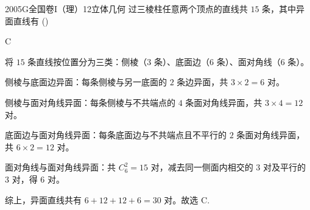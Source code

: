 
\begin{problem}{2005}{G}{全国卷I（理）}{12}{立体几何}
过三棱柱任意两个顶点的直线共 $15$ 条，其中异面直线有 (\hspace{1cm})
\begin{choices}
\end{choices}
\end{problem}

\begin{answer}
C
\end{answer}

\begin{solutions}
将 $15$ 条直线按位置分为三类：侧棱（$3$ 条）、底面边（$6$ 条）、面对角线（$6$ 条）。

侧棱与底面边异面：每条侧棱与另一底面的 $2$ 条边异面，共 $3 \times 2 = 6$ 对。

侧棱与面对角线异面：每条侧棱与不共端点的 $4$ 条面对角线异面，共 $3 \times 4 = 12$ 对。

底面边与面对角线异面：每条底面边与不共端点且不平行的 $2$ 条面对角线异面，共 $6 \times 2 = 12$ 对。

面对角线与面对角线异面：共 $\displaystyle C_{6}^{2} = 15$ 对，减去同一侧面内相交的 $3$ 对及平行的 $3$ 对，得 $6$ 对。

综上，异面直线共有 $6 + 12 + 12 + 6 = 30$ 对。故选 C.
\end{solutions}